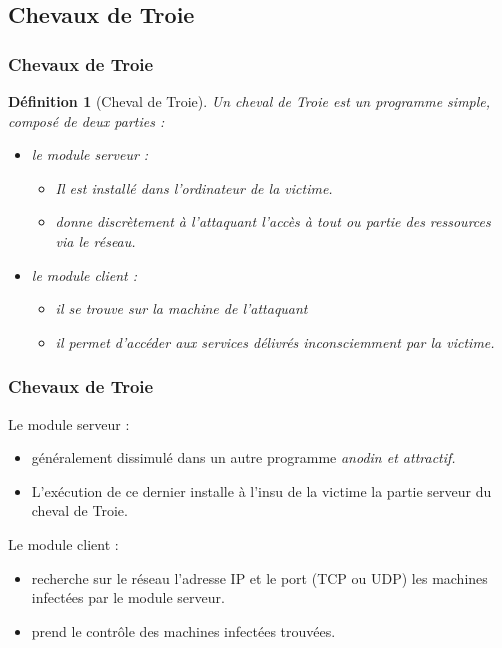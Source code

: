 \documentclass{beamer}
\newtheorem{deft}{Définition}
\begin{document}
\subsection{Chevaux de Troie}

\begin{frame}
\frametitle{Chevaux de Troie}

\begin{deft}[Cheval de Troie]
Un cheval de Troie est un programme simple, composé de deux parties : 
\begin{itemize}
\item le module serveur :
  \begin{itemize}
  \item Il est installé dans l'ordinateur de la victime.
    \item  donne discrètement à l'attaquant l'accès à tout ou partie des ressources via le réseau.
    \end{itemize}
\item  le module client :
  \begin{itemize}
  \item  il se trouve sur la machine de l'attaquant
    \item il permet d'accéder aux services délivrés inconsciemment par la victime.
    \end{itemize}
\end{itemize}




\end{deft}

\end{frame}



\begin{frame}
\frametitle{Chevaux de Troie}
{\color{blue} Le module serveur :}
\begin{itemize}
\item généralement dissimulé dans un autre programme \textit{\color{blue} anodin et attractif.}
  \item L'exécution de ce dernier  installe à l'insu de la victime la partie serveur du cheval de Troie.
\end{itemize}
\pause 
{\color{blue} Le module client :}
\begin{itemize}
\item recherche sur le réseau  l'adresse IP et le port (TCP ou UDP) les machines infectées par le module serveur.
  \item prend le contrôle des machines infectées trouvées. 
\end{itemize}
\end{frame}
\end{document}

